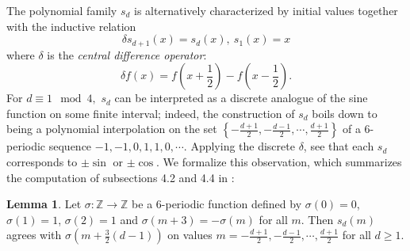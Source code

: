 \documentclass[12pt]{amsart}
\theoremstyle{definition}
\newtheorem{lemma}[theorem]{Lemma}
\begin{document}
The polynomial family $s_d$ is alternatively characterized by initial values together with the inductive relation
$$ \delta s_{d+1}(x) = s_d(x),\ s_1(x) = x$$
where $\delta$ is the \textit{central difference operator}:
$$ \delta f(x) = f\left(x+\frac{1}{2}\right) - f\left(x-\frac{1}{2}\right).$$
For $d \equiv 1 \mod 4,$ $s_d$ can be interpreted as a discrete analogue of the sine function on some finite interval; indeed, the construction of $s_d$ boils down to being a polynomial interpolation on the set $\left\{-\frac{d+1}{2},-\frac{d-1}{2},\cdots,\frac{d+1}{2}\right\}$ of a 6-periodic sequence $-1,-1,0,1,1,0,\cdots$. Applying the discrete $\delta$, see that each $s_d$ corresponds to $\pm \sin$ or $\pm \cos$. We formalize this observation, which summarizes the computation of subsections 4.2 and 4.4 in \cite{doyle2022polynomialsrationalpreperiodicpoints}:
\begin{lemma}\label{lem:6periodic}
    Let $\sigma:\mathbb{Z}\to \mathbb{Z}$ be a 6-periodic function defined by $\sigma(0) = 0$, $\sigma(1) = 1$, $\sigma(2)=1$ and $\sigma(m+3) = -\sigma(m)$ for all $m$. Then $s_d(m)$ agrees with $\sigma(m+\frac{3}{2}(d-1))$ on values $m=-\frac{d+1}{2},-\frac{d-1}{2},\cdots,\frac{d+1}{2}$ for all $d\geq 1$.
\end{lemma}
\end{document}
